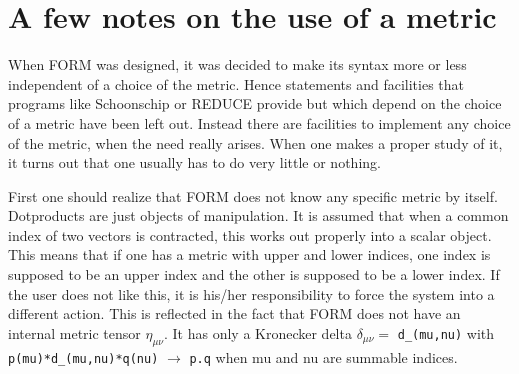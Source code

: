 
\chapter{A few notes on the use of a metric}
\label{metric}

\noindent When FORM was designed, it was decided to make its syntax more or 
less independent of a choice of the metric. Hence statements 
and facilities that programs like Schoonschip or 
REDUCE provide but which depend on the choice of a metric 
have been left out. Instead there are facilities to implement any choice of 
the metric, when the need really arises. When one makes a proper study of 
it, it turns out that one usually has to do very little or nothing. \hfill 
\vspace{2mm}

\noindent First one should realize that FORM does not know any specific 
metric by itself. Dotproducts are just objects of manipulation. It is 
assumed that when a common index of two vectors is contracted, this works 
out properly into a scalar object. This means that if one has a metric with 
upper and lower indices, one 
index is supposed to be an upper index and the other is supposed to be a 
lower index. If the user does not like this, it is his/her responsibility 
to force the system into a different action. This is reflected in the fact 
that FORM does not have an internal metric tensor 
$\eta_{\mu\nu}$. It has only a Kronecker 
delta $\delta_{\mu\nu} =$ \verb:d_(mu,nu): with 
\verb:p(mu)*d_(mu,nu)*q(nu): $\rightarrow$ \verb:p.q: when mu and nu are 
summable indices. \hfill \vspace{2mm}

